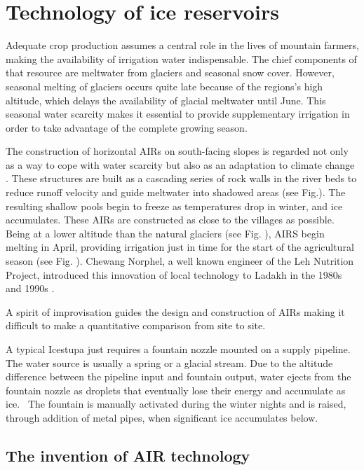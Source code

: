 \chapter{Technology of ice reservoirs}

Adequate crop production assumes a central role in the lives of mountain farmers, making the availability of
irrigation water indispensable. The chief components of that resource are meltwater from glaciers and seasonal
snow cover. However, seasonal melting of glaciers occurs quite late because of the regions's high altitude,
which delays the availability of glacial meltwater until June. This seasonal water scarcity makes it essential
to provide supplementary irrigation in order to take advantage of the complete growing season. 

The construction of horizontal AIRs on south-facing slopes is regarded not only as a way to cope with water
scarcity but also as an adaptation to climate change \citep{norphelArtificialGlacierHigh2009}. These structures
are built as a cascading series of rock walls in the river beds to reduce runoff velocity and guide meltwater
into shadowed areas (see Fig.). The resulting shallow pools begin to freeze as temperatures drop in winter, and
ice accumulates. These AIRs are constructed as close to the villages as possible. Being at a lower altitude than
the natural glaciers (see Fig. ), AIRS begin melting in April, providing irrigation just in time for the start
of the agricultural season (see Fig. ). Chewang Norphel, a well known engineer of the Leh Nutrition Project,
introduced this innovation of local technology to Ladakh in the 1980s and 1990s \citep{vinceGlacierMan2009}.

A spirit of improvisation guides the design and construction of AIRs making it difficult to make a quantitative
comparison from site to site.

A typical Icestupa just requires a fountain nozzle mounted on a supply pipeline. The water source is usually a
spring or a glacial stream. Due to the altitude difference between the pipeline input and fountain output, water
ejects from the fountain nozzle as droplets that eventually lose their energy and accumulate as ice.  The
fountain is manually activated during the winter nights and is raised, through addition of metal pipes, when
significant ice accumulates below.

\section{The invention of AIR technology}

